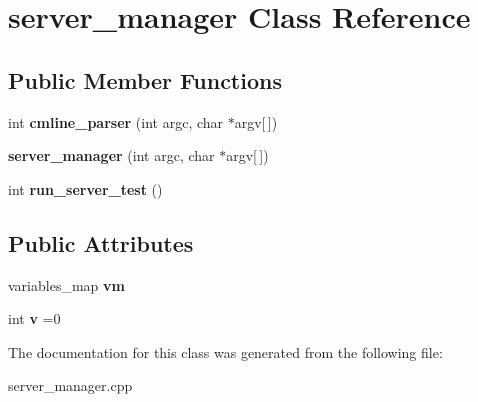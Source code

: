 \hypertarget{classserver__manager}{}\section{server\+\_\+manager Class Reference}
\label{classserver__manager}
\subsection*{Public Member Functions}
\begin{DoxyCompactItemize}
\item 
\mbox{\label{classserver__manager_ad6a2b5fa20dd258610d4fa23afbcb616}} 
int {\bfseries cmline\+\_\+parser} (int argc, char $\ast$argv\mbox{[}$\,$\mbox{]})
\item 
\mbox{\label{classserver__manager_a3e5bb1320afcea0e792101991121cfa0}} 
{\bfseries server\+\_\+manager} (int argc, char $\ast$argv\mbox{[}$\,$\mbox{]})
\item 
\mbox{\label{classserver__manager_aaad0b81492c3b7c7cb5dd6b8c281578e}} 
int {\bfseries run\+\_\+server\+\_\+test} ()
\end{DoxyCompactItemize}
\subsection*{Public Attributes}
\begin{DoxyCompactItemize}
\item 
\mbox{\label{classserver__manager_a9540fc4079c74afe8c3dead7fb7f8505}} 
variables\+\_\+map {\bfseries vm}
\item 
\mbox{\label{classserver__manager_accb278817e0a8f3f49c6d5cd500e3970}} 
int {\bfseries v} =0
\end{DoxyCompactItemize}


The documentation for this class was generated from the following file\+:\begin{DoxyCompactItemize}
\item 
server\+\_\+manager.\+cpp\end{DoxyCompactItemize}

